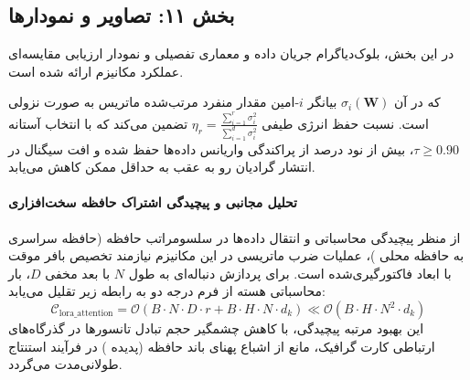 \subsection*{بخش ۱۱: تصاویر و نمودارها }
در این بخش، بلوک‌دیاگرام جریان داده و معماری تفصیلی و نمودار ارزیابی مقایسه‌ای عملکرد مکانیزم  ارائه شده است.



که در آن $\sigma_i(\mathbf{W})$ بیانگر $i$-امین مقدار منفرد مرتب‌شده ماتریس به صورت نزولی است. نسبت حفظ انرژی طیفی $\eta_r = \frac{\sum_{i=1}^r \sigma_i^2}{\sum_{i=1}^{d} \sigma_i^2}$ تضمین می‌کند که با انتخاب آستانه $\tau \ge 0.90$، بیش از نود درصد از پراکندگی واریانس داده‌ها حفظ شده و افت سیگنال در انتشار گرادیان رو به عقب به حداقل ممکن کاهش می‌یابد.

\paragraph{تحلیل مجانبی و پیچیدگی اشتراک حافظه سخت‌افزاری}
از منظر پیچیدگی محاسباتی و انتقال داده‌ها در سلسومراتب حافظه (حافظه سراسری  به حافظه محلی )، عملیات ضرب ماتریسی در این مکانیزم نیازمند تخصیص بافر موقت با ابعاد فاکتورگیری‌شده است. برای پردازش دنباله‌ای به طول $N$ با بعد مخفی $D$، بار محاسباتی هسته از فرم درجه دو به رابطه زیر تقلیل می‌یابد:
\begin{equation}
\label{eq:complexity_lora_attention}
\mathcal{C}_{\text{lora\_attention}} = \mathcal{O}\left( B \cdot N \cdot D \cdot r + B \cdot H \cdot N \cdot d_k \right) \ll \mathcal{O}\left( B \cdot H \cdot N^2 \cdot d_k \right)
\end{equation}
این بهبود مرتبه پیچیدگی، با کاهش چشمگیر حجم تبادل تانسورها در گذرگاه‌های ارتباطی کارت گرافیک، مانع از اشباع پهنای باند حافظه (پدیده ) در فرآیند استنتاج طولانی‌مدت می‌گردد.